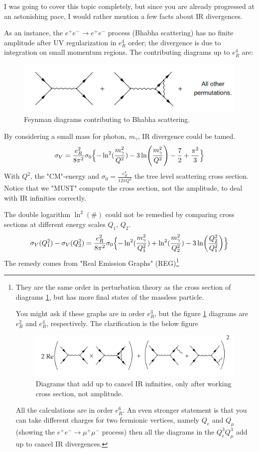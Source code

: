 \documentclass[11pt]{article}
\begin{document}
\begin{problem}
	I was going to cover this topic completely, but since you are already progressed at an astonishing pace, I would rather mention a few facts about IR divergences.
	
	As an instance, the $e^+e^- \to e^+e^-$ process (Bhabha scattering) has no finite amplitude after UV regularization in $e^4_R$ order; the divergence is due to integration on small momentum regions. The contributing diagrams up to $e^4_R$ are:
	\begin{figure}[H]
		\centering
		\includegraphics[width=0.95\linewidth]{img/9.png}
		\caption{Feynman diagrams contributing to Bhabha scattering.}
		\label{irdiv1}
	\end{figure}
	By considering a small mass for photon, $m_\gamma$, IR divergence could be tamed.
	\[
	\sigma_V = \frac{e^2_R}{8\pi^2} \sigma_0 \Bigl\{-\ln^2(\frac{m_\gamma^2}{Q^2}) -3\ln (\frac{m^2_\gamma}{Q^2}) -\frac72 + \frac{\pi^2}{3}\Bigr\}
	\]
	With $Q^2$, the "CM"-energy and $\sigma_0 = \frac{e^4_R}{12\pi Q^2}$ the tree level scattering cross section. Notice that we "MUST" compute the cross section, not the amplitude, to deal with IR infinities correctly.
	
	The double logarithm $\ln^2(\#)$ could not be remedied by comparing cross sections at different energy scales $Q_1$, $Q_2$.
	\[
	\sigma_V(Q_1^2)-\sigma_V(Q_2^2) =  \frac{e^2_R}{8\pi^2} \sigma_0 \Bigl\{-\ln^2(\frac{m_\gamma^2}{Q_1^2}) + \ln^2(\frac{m_\gamma^2}{Q_2^2}) -3\ln (\frac{Q_2^2}{Q_1^2})\Bigr\}
	\]
	The remedy comes from "Real Emission Graphs" (REG)\footnote{They are the same order in perturbation theory as the cross section of diagrams \ref{irdiv1}, but has more final states of the massless particle.
	
You might ask if these graphs are in order $e^3_R$, but the figure \ref{irdiv1} diagrams are $e^2_R$ and $e^4_R$, respectively. The clarification is the below figure 
\begin{figure}[H]
	\centering
	\includegraphics[width=0.85\linewidth]{img/11.png}
	\caption{Diagrams that add up to cancel IR infinities, only after working cross section, not amplitude.}
	\label{clarif}
\end{figure}
All the calculations are in order $e^6_R$. An even stronger statement is that you can take different charges for two fermionic vertices, namely $Q_e$ and $Q_\mu$ (showing the $e^+e^- \to \mu^+ \mu^-$ process) then all the diagrams in the $Q^3_e Q^3_\mu$ add up to cancel IR divergences.
}


\end{problem}
\end{document}
